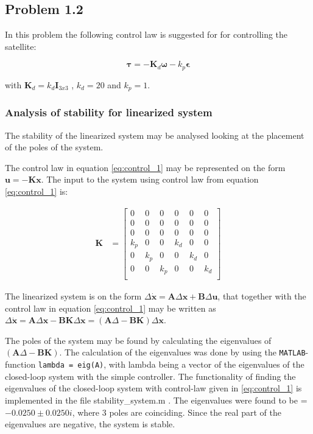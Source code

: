\subsection*{Problem 1.2}
In this problem the following control law is suggested for for controlling the satellite: 

\begin{equation}
  \mathbf{\tau} = -\mathbf{K}_d \boldsymbol{\omega} - k_p \boldsymbol{\epsilon}
  \label{eq:control_1}
\end{equation}

with $\mathbf{K}_d = k_d \mathbf{I}_{3x3}$ , $k_d = 20$ and $k_p = 1$.  

\subsubsection*{Analysis of stability for  linearized system}

The stability of the linearized system may be analysed looking at the placement of the poles of the system.

The control law in equation \eqref{eq:control_1} may be represented on the form $ \mathbf{u} = - \mathbf{K} \mathbf{x}$. The input to the system using control law from equation \eqref{eq:control_1} is:

\begin{equation}
\begin{aligned}
    \mathbf{K}
    &=
    \begin{bmatrix}
    0 & 0 & 0 & 0 & 0 & 0 \\ 
    0 & 0 & 0 & 0 & 0 & 0 \\ 
    0 & 0 & 0 & 0 & 0 & 0 \\ 
    k_p & 0 & 0 & k_d & 0 & 0 \\ 
    0 & k_p & 0 & 0 & k_d & 0 \\ 
    0 & 0 & k_p & 0 & 0 & k_d \\ 
    \end{bmatrix}
    \label{eq:K}
\end{aligned}
\end{equation}

The linearized system is on the form $\Delta \dot{ \mathbf{x}} = \mathbf{A} \Delta \mathbf{x} + \mathbf{B} \Delta \mathbf{u}$, that together with the control law in equation \eqref{eq:control_1} may be written as $\Delta \dot{\mathbf{x}} = \mathbf{A}\Delta \mathbf{x} - \mathbf{B K} \Delta \mathbf{x} = ( \mathbf{A}\Delta  - \mathbf{B K} ) \Delta \mathbf{x} $.

The poles of the system may be found by calculating the eigenvalues of $( \mathbf{A}\Delta  - \mathbf{B K} )$. The calculation of the eigenvalues was done by using the \texttt{MATLAB}-function \texttt{lambda = eig(A)}, with lambda being a vector of the eigenvalues of the closed-loop system with the simple controller. The functionality of finding the eigenvalues of the closed-loop system with control-law given in \eqref{eq:control_1} is implemented in the file
{\color{blue}  stability\_system.m }. The eigenvalues were found to be = $- 0.0250 \pm 0.0250i$, where 3 poles are coinciding. Since the real part of the eigenvalues are negative, the system is stable.

